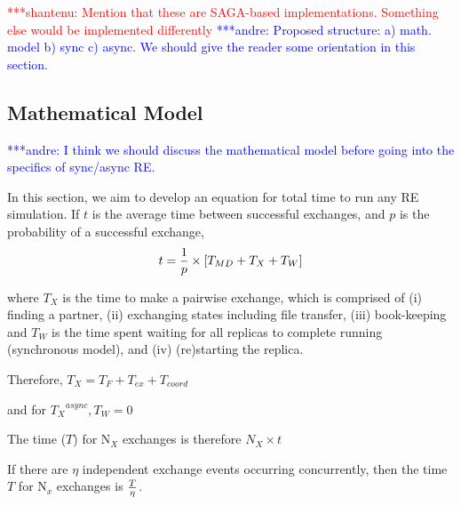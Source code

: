 \documentclass{rspublic}
\newcommand{\jhanote}[1]{ {\textcolor{red} { ***shantenu: #1 }}}
\newcommand{\alnote}[1]{ {\textcolor{blue} { ***andre: #1 }}}
\newcommand{\alnote}[1]{}
\newcommand{\jhanote}[1]{}
\begin{document}


\jhanote{Mention that these are SAGA-based implementations. Something
  else would be implemented differently}
\alnote{Proposed structure: a) math. model b) sync c) async. We should give the reader some orientation in this section.}

\subsection{Mathematical Model}
\alnote{I think we should discuss the mathematical model before going into the specifics of sync/async RE.}

In this section, we aim to develop an equation for total time to run any RE simulation. If $t$ is the average time between successful exchanges, and $p$ is the probability of a successful exchange, 
\begin{eqnarray}
t=  {1 \over p} \times {[T_{MD} + T_{X} + T_{W}]} 
\label{eq:timebtw}
\end{eqnarray}

where $T_{X}$ is the time to make a pairwise exchange, which is comprised of (i) finding a partner, (ii) exchanging
states including file transfer, (iii) book-keeping and $T_{W}$ is the time spent waiting for all replicas to complete running (synchronous model), and (iv) (re)starting the replica.

Therefore, ${T_{X}} = {T_F + T_{ex} + T_{coord}}$ 

and for ${T_{X}}^{async}, T_W = 0$

The time ($T$) for N$_{X}$ exchanges is therefore $N_{X} \times t$

If there are $\eta$ independent exchange events occurring concurrently, then the time $T$ for 
N$_x$ exchanges is $T \over \eta$.



\end{document}

